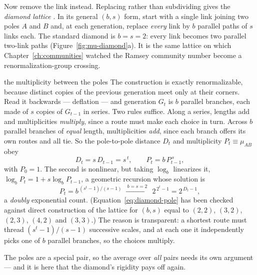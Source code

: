 Now remove the link instead. Replacing rather than subdividing gives the
\emph{diamond lattice} \citep{migdal1975,kadanoff1976}. In its general $(b,s)$
form, start with a single link joining two poles $A$ and $B$ and, at each
generation, replace \emph{every} link by $b$ parallel paths of $s$ links each. The
standard diamond is $b=s=2$: every link becomes two parallel two-link paths
(Figure~\ref{fig:mu-diamond}a). It is the same lattice on which
Chapter~\ref{ch:communities} watched the Ramsey community number become a
renormalization-group crossing.

\begin{calculation}{the multiplicity between the poles}
The construction is exactly renormalizable, because distinct copies of the previous
generation meet only at their corners. Read it backwards --- deflation --- and
generation $G_t$ is $b$ parallel branches, each made of $s$ copies of $G_{t-1}$ in
series. Two rules suffice. Along a series, lengths add and multiplicities
\emph{multiply}, since a route must make each choice in turn. Across $b$ parallel
branches of \emph{equal} length, multiplicities \emph{add}, since each branch offers
its own routes and all tie. So the pole-to-pole distance $D_t$ and multiplicity
$P_t\equiv\mu_{AB}$ obey
\begin{equation}
  D_t = s\,D_{t-1} = s^{\,t},
  \qquad
  P_t = b\,P_{t-1}^{\,s},
  \label{eq:diamond-rec}
\end{equation}
with $P_0=1$. The second is nonlinear, but taking $\log_b$ linearizes it,
$\log_b P_t = 1 + s\log_b P_{t-1}$, a geometric recursion whose solution is
\begin{equation}
  P_t = b^{\,(s^{t}-1)/(s-1)}
  \;\xrightarrow{\ b=s=2\ }\;
  2^{\,2^{t}-1} = 2^{\,D_t-1},
  \label{eq:diamond-pole}
\end{equation}
a \emph{doubly} exponential count. (Equation~\eqref{eq:diamond-pole} has been
checked against direct construction of the lattice for $(b,s)$ equal to $(2,2)$,
$(3,2)$, $(2,3)$, $(4,2)$ and $(3,3)$.) The reason is transparent: a shortest route
must thread $(s^t-1)/(s-1)$ successive scales, and at each one it independently
picks one of $b$ parallel branches, so the choices multiply.
\end{calculation}

The poles are a special pair, so the average over \emph{all} pairs needs its own
argument --- and it is here that the diamond's rigidity pays off again.

